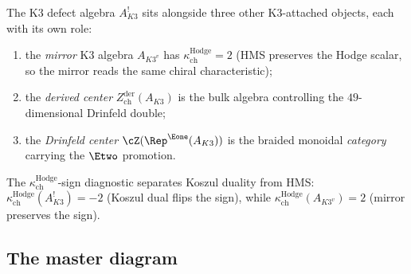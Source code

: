 \begin{remark}
\label{rem:three-dualities-k3}
The K3 defect algebra $A_{K3}^!$ sits alongside three other K3-attached objects, each with its own role:
\begin{enumerate}[label=\textup{(\alph*)}]
 \item the \emph{mirror} K3 algebra $A_{K3^v}$ has $\kappa_{\mathrm{ch}}^{\mathrm{Hodge}} = 2$ (HMS preserves the Hodge scalar, so the mirror reads the same chiral characteristic);
 \item the \emph{derived center} $Z^{\mathrm{der}}_{\mathrm{ch}}(A_{K3})$ is the bulk algebra controlling the $49$-dimensional Drinfeld double;
 \item the \emph{Drinfeld center} $\cZ(\Rep^{\Eone}(A_{K3}))$ is the braided monoidal \emph{category} carrying the $\Etwo$ promotion.
\end{enumerate}
The $\kappa_{\mathrm{ch}}^{\mathrm{Hodge}}$-sign diagnostic separates Koszul duality from HMS: $\kappa_{\mathrm{ch}}^{\mathrm{Hodge}}(A_{K3}^!) = -2$ (Koszul dual flips the sign), while $\kappa_{\mathrm{ch}}^{\mathrm{Hodge}}(A_{K3^v}) = 2$ (mirror preserves the sign).
\end{remark}

\subsection{The master diagram}
\label{subsec:k3-master-diagram}

